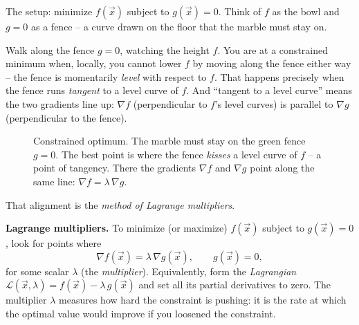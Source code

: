 The setup: minimize $f(\vec{x})$ subject to $g(\vec{x})=0$. Think of $f$ as the bowl
and $g=0$ as a fence -- a curve drawn on the floor that the marble must stay on.

\begin{intuitionbox}
Walk along the fence $g=0$, watching the height $f$. You are at a constrained
minimum when, locally, you cannot lower $f$ by moving along the fence either way --
the fence is momentarily \emph{level} with respect to $f$. That happens precisely when
the fence runs \emph{tangent} to a level curve of $f$. And ``tangent to a level
curve'' means the two gradients line up: $\nabla f$ (perpendicular to $f$'s level
curves) is parallel to $\nabla g$ (perpendicular to the fence).
\end{intuitionbox}

\begin{figure}[H]
\centering
{}
\caption{Constrained optimum. The marble must stay on the green fence $g=0$. The best
point is where the fence \emph{kisses} a level curve of $f$ -- a point of tangency.
There the gradients $\nabla f$ and $\nabla g$ point along the same line:
$\nabla f = \lambda\,\nabla g$.}
\label{ch36:fig-lagrange}
\end{figure}

That alignment is the \emph{method of Lagrange multipliers}.

\begin{formalbox}
\label{ch36:thm-lagrange}
\textbf{Lagrange multipliers.} To minimize (or maximize) $f(\vec{x})$ subject to $g(\vec{x})=0$, look for points
where
\[
  \nabla f(\vec{x}) = \lambda\,\nabla g(\vec{x}), \qquad g(\vec{x})=0,
\]
for some scalar $\lambda$ (the \emph{multiplier}). Equivalently, form the
\emph{Lagrangian} $\mathcal{L}(\vec{x},\lambda)=f(\vec{x})-\lambda\,g(\vec{x})$ and set
all its partial derivatives to zero. The multiplier $\lambda$ measures how hard the
constraint is pushing: it is the rate at which the optimal value would improve if you
loosened the constraint.
\end{formalbox}

